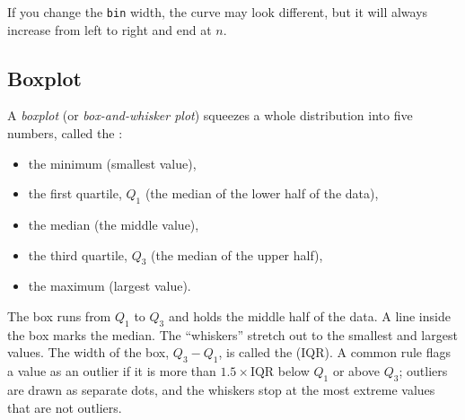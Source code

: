 If you change the \texttt{bin} width, the curve may look different, but it will always increase from left to right and end at $n$.


\subsection{Boxplot}

A \textit{boxplot} (or \textit{box-and-whisker plot}) squeezes a whole distribution into five numbers, called the :
\begin{itemize}
    \item the minimum (smallest value),
    \item the first quartile, $Q_1$ (the median of the lower half of the data),
    \item the median (the middle value),
    \item the third quartile, $Q_3$ (the median of the upper half),
    \item the maximum (largest value).
\end{itemize}

The box runs from $Q_1$ to $Q_3$ and holds the middle half of the data. A line inside the box marks the median. The ``whiskers'' stretch out to the smallest and largest values. The width of the box, $Q_3 - Q_1$, is called the  (IQR). A common rule flags a value as an outlier if it is more than $1.5 \times \text{IQR}$ below $Q_1$ or above $Q_3$; outliers are drawn as separate dots, and the whiskers stop at the most extreme values that are not outliers.


